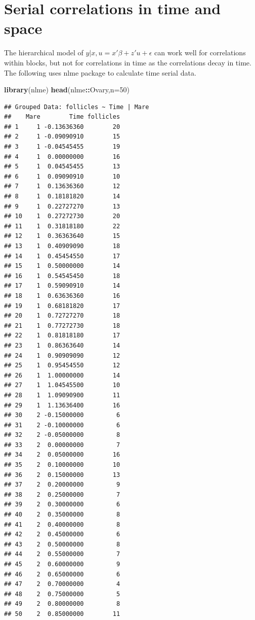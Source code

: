 \documentclass[]{book}
\newenvironment{Shaded}{\begin{snugshade}}{\end{snugshade}}
\newcommand{\DataTypeTok}[1]{\textcolor[rgb]{0.13,0.29,0.53}{#1}}
\newcommand{\DecValTok}[1]{\textcolor[rgb]{0.00,0.00,0.81}{#1}}
\newcommand{\KeywordTok}[1]{\textcolor[rgb]{0.13,0.29,0.53}{\textbf{#1}}}
\newcommand{\NormalTok}[1]{#1}
\newcommand{\OperatorTok}[1]{\textcolor[rgb]{0.81,0.36,0.00}{\textbf{#1}}}
\begin{document}
\hypertarget{serial-correlations-in-time-and-space}{%
\section{Serial correlations in time and space}\label{serial-correlations-in-time-and-space}}

The hierarchical model of \(y|x, u = x'\beta+z'u+\epsilon\) can work well for correlations within blocks, but not for correlations in time as the correlations decay in time. The following uses nlme package to calculate time serial data.

\begin{Shaded}
\begin{Highlighting}[]
\KeywordTok{library}\NormalTok{(nlme)}
\KeywordTok{head}\NormalTok{(nlme}\OperatorTok{::}\NormalTok{Ovary,}\DataTypeTok{n=}\DecValTok{50}\NormalTok{)}
\end{Highlighting}
\end{Shaded}

\begin{verbatim}
## Grouped Data: follicles ~ Time | Mare
##    Mare        Time follicles
## 1     1 -0.13636360        20
## 2     1 -0.09090910        15
## 3     1 -0.04545455        19
## 4     1  0.00000000        16
## 5     1  0.04545455        13
## 6     1  0.09090910        10
## 7     1  0.13636360        12
## 8     1  0.18181820        14
## 9     1  0.22727270        13
## 10    1  0.27272730        20
## 11    1  0.31818180        22
## 12    1  0.36363640        15
## 13    1  0.40909090        18
## 14    1  0.45454550        17
## 15    1  0.50000000        14
## 16    1  0.54545450        18
## 17    1  0.59090910        14
## 18    1  0.63636360        16
## 19    1  0.68181820        17
## 20    1  0.72727270        18
## 21    1  0.77272730        18
## 22    1  0.81818180        17
## 23    1  0.86363640        14
## 24    1  0.90909090        12
## 25    1  0.95454550        12
## 26    1  1.00000000        14
## 27    1  1.04545500        10
## 28    1  1.09090900        11
## 29    1  1.13636400        16
## 30    2 -0.15000000         6
## 31    2 -0.10000000         6
## 32    2 -0.05000000         8
## 33    2  0.00000000         7
## 34    2  0.05000000        16
## 35    2  0.10000000        10
## 36    2  0.15000000        13
## 37    2  0.20000000         9
## 38    2  0.25000000         7
## 39    2  0.30000000         6
## 40    2  0.35000000         8
## 41    2  0.40000000         8
## 42    2  0.45000000         6
## 43    2  0.50000000         8
## 44    2  0.55000000         7
## 45    2  0.60000000         9
## 46    2  0.65000000         6
## 47    2  0.70000000         4
## 48    2  0.75000000         5
## 49    2  0.80000000         8
## 50    2  0.85000000        11
\end{verbatim}
\end{document}
